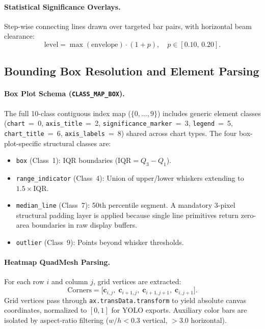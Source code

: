 \documentclass[11pt,twocolumn]{article}
\begin{document}
\paragraph{Statistical Significance Overlays.} Step-wise connecting lines drawn over targeted bar pairs, with horizontal beam clearance:
\begin{equation}\label{eq:sig_level}
  \text{level} = \max(\text{envelope})\cdot(1 + p),\quad p \in [0.10,\,0.20].
\end{equation}

\subsection{Bounding Box Resolution and Element Parsing}\label{sec:bbox}

\paragraph{Box Plot Schema (\texttt{CLASS\_MAP\_BOX}).}
The full 10-class contiguous index map ($\{0,\ldots,9\}$) includes generic element classes (\texttt{chart}~=~0, \texttt{axis\_title}~=~2, \texttt{significance\_marker}~=~3, \texttt{legend}~=~5, \texttt{chart\_title}~=~6, \texttt{axis\_labels}~=~8) shared across chart types.
The four box-plot-specific structural classes are:
\begin{itemize}[nosep]
  \item \texttt{box} (Class~1): IQR boundaries ($\text{IQR} = Q_3 - Q_1$).
  \item \texttt{range\_indicator} (Class~4): Union of upper/lower whiskers extending to $1.5\times\text{IQR}$.
  \item \texttt{median\_line} (Class~7): 50th percentile segment.
  A mandatory 3-pixel structural padding layer is applied because single line primitives return zero-area boundaries in raw display buffers.
  \item \texttt{outlier} (Class~9): Points beyond whisker thresholds.
\end{itemize}

\paragraph{Heatmap QuadMesh Parsing.}
For each row $i$ and column $j$, grid vertices are extracted:
\begin{equation}\label{eq:quad_corners}
  \text{Corners} = \bigl[\mathbf{c}_{i,j},\;\mathbf{c}_{i+1,j},\;\mathbf{c}_{i+1,j+1},\;\mathbf{c}_{i,j+1}\bigr].
\end{equation}
Grid vertices pass through \texttt{ax.transData.transform} to yield absolute canvas coordinates, normalized to $[0,1]$ for YOLO exports. Auxiliary color bars are isolated by aspect-ratio filtering ($w/h < 0.3$ vertical, $>3.0$ horizontal).
\end{document}
